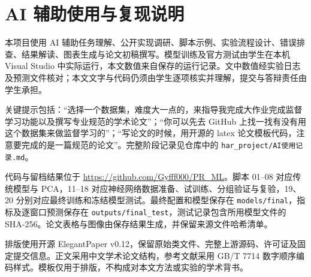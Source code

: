 \section{AI 辅助使用与复现说明}
本项目使用 AI 辅助任务理解、公开实现调研、脚本示例、实验流程设计、错误排查、结果解读、图表生成与论文初稿撰写。模型训练及官方测试由学生在本机 Visual Studio 中实际运行，本文数值来自保存的运行记录。文中数值经实验日志及预测文件核对；本文文字与代码仍须由学生逐项核实并理解，提交与答辩责任由学生承担。

关键提示包括：“选择一个数据集，难度大一点的，来指导我完成大作业完成监督学习功能以及撰写专业规范的学术论文”；“你可以先去 GitHub 上找一找有没有用这个数据集来做监督学习的”；“写论文的时候，用开源的 latex 论文模板代码，注意要完成的是一篇规范的论文”。完整阶段记录见仓库中的 \texttt{har\_project/AI使用记录.md}。

代码与留档结果位于 \url{https://github.com/Gyfff000/PR_ML}。脚本 01--08 对应传统模型与 PCA，11--18 对应神经网络数据准备、试训练、分组验证与复验，19、20 分别对应最终训练和冻结模型测试。最终配置和模型保存在 \texttt{models/final}，指标及逐窗口预测保存在 \texttt{outputs/final\_test}，测试记录包含所用模型文件的 SHA-256。论文表格与图像由保存结果生成，并保留来源文件哈希清单。

排版使用开源 ElegantPaper v0.12，保留原始类文件、完整上游源码、许可证及固定提交信息。正文采用中文学术论文结构，参考文献采用 GB/T 7714 数字顺序编码样式。模板仅用于排版，不构成对本文方法或实验的学术背书。
